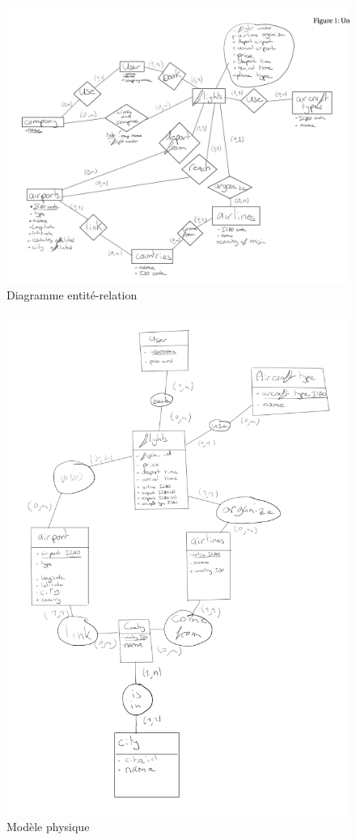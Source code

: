 \documentclass{ceri/sty/rapport}
\begin{document}
\begin{figure}[h]
    \centering
    \includegraphics[width=0.85\linewidth]{images/diag_er.png}
    \caption{Diagramme entité-relation}
    \label{fig:diag_er}
\end{figure}

\begin{figure}[h]
    \centering
    \includegraphics[width=0.85\linewidth]{images/diag_phys.png}
    \caption{Modèle physique}
    \label{fig:diag_phys}
\end{figure}
\end{document}
